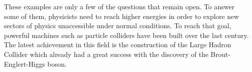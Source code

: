     These examples are only a few of the questions that remain open. To answer some of them, physicists need to reach higher energies in order to explore new sectors of physics unaccessible under normal conditions. To reach that goal, powerful machines such as particle colliders have been built over the last century. The latest achievement in this field is the construction of the Large Hadron Collider which already had a great success with the discovery of the Brout-Englert-Higgs boson.
